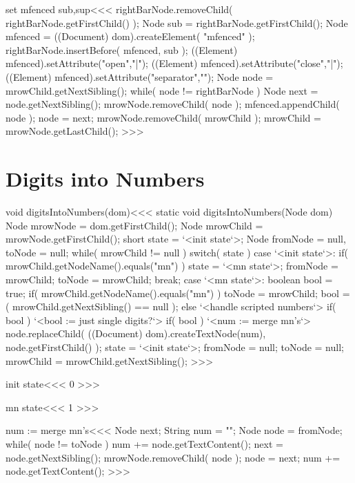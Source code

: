 \documentclass{article}
\begin{document}
\<set mfenced sub,sup\><<<
rightBarNode.removeChild( rightBarNode.getFirstChild() );
Node sub = rightBarNode.getFirstChild();
Node mfenced = ((Document) dom).createElement( "mfenced" );
rightBarNode.insertBefore( mfenced, sub );
((Element) mfenced).setAttribute("open","|");
((Element) mfenced).setAttribute("close","|");
((Element) mfenced).setAttribute("separator","");
Node node = mrowChild.getNextSibling();
while( node != rightBarNode ){
   Node next = node.getNextSibling();
   mrowNode.removeChild( node );
   mfenced.appendChild( node );
   node = next;
}
mrowNode.removeChild( mrowChild );
mrowChild = mrowNode.getLastChild();
>>>


\section{Digits into Numbers}

\<void digitsIntoNumbers(dom)\><<<
static void digitsIntoNumbers(Node dom){
   Node mrowNode = dom.getFirstChild();
   Node mrowChild = mrowNode.getFirstChild();
   short state = `<init state`>;
   Node fromNode = null, 
          toNode = null;
   while( mrowChild != null ){
      switch( state ){
         case `<init state`>:
              if( mrowChild.getNodeName().equals("mn") ){
                 state = `<mn state`>;
                 fromNode = mrowChild;
                 toNode = mrowChild;
              }
            break;
         case `<mn state`>:
              boolean bool = true;
              if( mrowChild.getNodeName().equals("mn") ){
                 toNode = mrowChild;
                 bool = ( mrowChild.getNextSibling() == null );
              }  
              else
              { `<handle scripted numbers`> }
              if( bool )
              { `<bool := just single digits?`>
                if( bool ){
                   `<num := merge mn's`>
                   node.replaceChild( ((Document) dom).createTextNode(num),
                                      node.getFirstChild() 
                                    );
                }
                state = `<init state`>;
                fromNode = null;
                toNode = null;
      }       } 
      mrowChild = mrowChild.getNextSibling();
}  }
>>>


\<init state\><<<
0
>>>

\<mn state\><<<
1
>>>

\<num := merge mn's\><<<
Node next;
String num = "";
Node node = fromNode;
while( node != toNode ){
  num += node.getTextContent();
  next = node.getNextSibling();
  mrowNode.removeChild( node );
  node = next;
} 
num += node.getTextContent();
>>>
\end{document}
